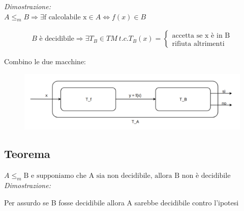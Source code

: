 \textit{Dimostrazione:} \\
$A \le_{m} B \Rightarrow \exists \text{f calcolabile x} \in A \Leftrightarrow f(x) \in B$
\begin{fleqn}
    \begin{align*}
		B \text{ è decidibile} \Rightarrow \exists T_{B} \in TM \ t.c. T_{B}(x) =
		\begin{cases}
			\text{accetta se x è in B} \\ \text{rifiuta altrimenti}
		\end{cases}
	\end{align*}
\end{fleqn}
Combino le due macchine:
\begin{figure}[H]
	\centering\includegraphics[scale=0.35]{automa-serie.png}
\end{figure}
\subsection{Teorema}

$A \le_{m} \text{B e supponiamo che A sia non decidibile, allora B non è decidibile}$ \\
\textit{Dimostrazione:}

Per assurdo se B fosse decidibile allora A sarebbe decidibile contro l'ipotesi \\
\\
